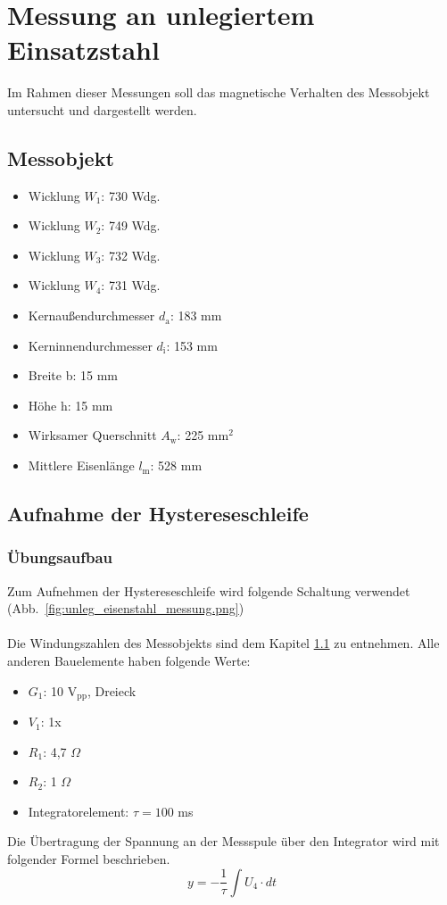 \documentclass[a4paper,twoside,12pt,DIV=13,BCOR=5mm,numbers=noenddot,cleardoublepage=empty]{scrbook}
\begin{document}
    \chapter{Messung an unlegiertem Einsatzstahl}
    Im Rahmen dieser Messungen soll das magnetische Verhalten des Messobjekt untersucht und dargestellt werden.
    \section{Messobjekt} \label{messobjekt}
    \begin{itemize}
        \item Wicklung $W_\mathrm{1}$: 730 Wdg.
        \item Wicklung $W_\mathrm{2}$: 749 Wdg.
        \item Wicklung $W_\mathrm{3}$: 732 Wdg.
        \item Wicklung $W_\mathrm{4}$: 731 Wdg.
        \item Kernau\ss{}endurchmesser $d_\mathrm{a}$: 183 mm
        \item Kerninnendurchmesser $d_\mathrm{i}$: 153 mm
        \item Breite b: 15 mm
        \item H\"ohe h: 15 mm
        \item Wirksamer Querschnitt $A_\mathrm{w}$: 225 mm$^2$
        \item Mittlere Eisenl\"ange $l_\mathrm{m}$: 528 mm
    \end{itemize}
    \section{Aufnahme der Hystereseschleife}
        \subsection{\"Ubungsaufbau}
        Zum Aufnehmen der Hystereseschleife wird folgende Schaltung verwendet (Abb.~\ref{fig:unleg_eisenstahl_messung.png})
        \\
        \\
        Die Windungszahlen des Messobjekts sind dem Kapitel \ref{messobjekt} zu 
        entnehmen. Alle anderen Bauelemente haben folgende Werte:
        \begin{itemize}
            \item $G_\mathrm{1}$: 10 V$_\mathrm{pp}$, Dreieck
            \item $V_\mathrm{1}$: 1x
            \item $R_\mathrm{1}$: 4,7 $\Omega$
            \item $R_\mathrm{2}$: 1 $\Omega$
            \item Integratorelement: $\tau = 100$ ms
        \end{itemize}
        Die \"Ubertragung der Spannung an der Messspule \"uber den Integrator wird mit 
        folgender Formel beschrieben. 
        \begin{equation}
            y = - \frac{1}{\tau} \int U_\mathrm{4} \cdot dt
        \end{equation}
\end{document}
